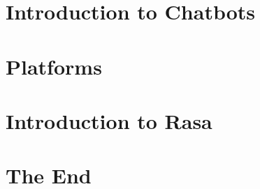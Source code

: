\section[Intro]{Introduction to Chatbots}


\section[Platforms]{Platforms}


\section[Rasa]{Introduction to Rasa}
% 
% 
% 

% 


% 
% 

% 

% 

% 

% 


\section[End]{The End}


